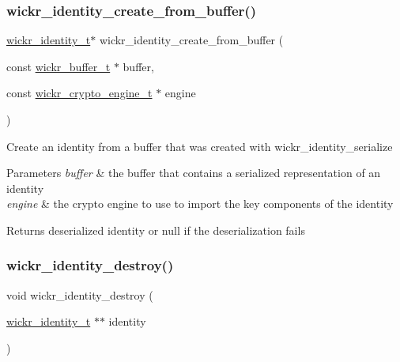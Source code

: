 \subsubsection{\texorpdfstring{wickr\+\_\+identity\+\_\+create\+\_\+from\+\_\+buffer()}{wickr\_identity\_create\_from\_buffer()}}
{\footnotesize\ttfamily \mbox{\hyperlink{structwickr__identity}{wickr\+\_\+identity\+\_\+t}}$\ast$ wickr\+\_\+identity\+\_\+create\+\_\+from\+\_\+buffer (\begin{DoxyParamCaption}\item[{const \mbox{\hyperlink{structwickr__buffer}{wickr\+\_\+buffer\+\_\+t}} $\ast$}]{buffer,  }\item[{const \mbox{\hyperlink{structwickr__crypto__engine}{wickr\+\_\+crypto\+\_\+engine\+\_\+t}} $\ast$}]{engine }\end{DoxyParamCaption})}

Create an identity from a buffer that was created with \textquotesingle{}wickr\+\_\+identity\+\_\+serialize\textquotesingle{}


\begin{DoxyParams}{Parameters}
{\em buffer} & the buffer that contains a serialized representation of an identity \\
\hline
{\em engine} & the crypto engine to use to import the key components of the identity \\
\hline
\end{DoxyParams}
\begin{DoxyReturn}{Returns}
deserialized identity or null if the deserialization fails 
\end{DoxyReturn}
\mbox{\label{group__wickr__identity_ga9e4a0f3736d52836c9a9fc61794c8ddd}} 
\subsubsection{\texorpdfstring{wickr\+\_\+identity\+\_\+destroy()}{wickr\_identity\_destroy()}}
{\footnotesize\ttfamily void wickr\+\_\+identity\+\_\+destroy (\begin{DoxyParamCaption}\item[{\mbox{\hyperlink{structwickr__identity}{wickr\+\_\+identity\+\_\+t}} $\ast$$\ast$}]{identity }\end{DoxyParamCaption})}

